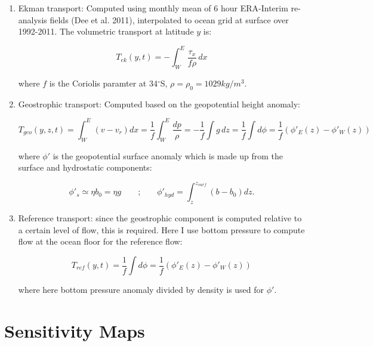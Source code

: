 \documentclass[a4paper,11pt]{article}
\newcommand{\degSym}{$^{\circ}$}
\begin{document}
    \begin{enumerate}
     \item Ekman transport: Computed using monthly mean of 6 hour ERA-Interim re-analysis fields (Dee et al. 2011), interpolated to ocean grid at surface over 1992-2011. The volumetric transport at latitude $y$ is: %
     
     \begin{equation}
      T_{ek}(y,t) = -\int_W^E\frac{\tau_x}{f\rho} \, dx
      \label{eq:ekTransp}
     \end{equation}
     
     where $f$ is the Coriolis paramter at 34\degSym S, $\rho = \rho_0 = 1029 kg/m^3$. 
     
     \item Geostrophic transport: Computed based on the geopotential height anomaly:
     
     \begin{equation}
      T_{geo}(y,z,t) = \int_W^E(v-v_r)dx = \dfrac{1}{f}\int_W^E \dfrac{dp}{\rho} = - \dfrac{1}{f} \int g\,dz = \dfrac{1}{f} \int d\phi= \dfrac{1}{f} (\phi'_E(z) - \phi'_W(z))
      \label{eq:geoTransp}
     \end{equation}
     
     where $\phi'$ is the geopotential surface anomaly which is made up from the surface and hydrostatic components:
     
     \begin{equation}
      \phi'_s \simeq \eta b_0 = \eta g \qquad\text{;}\qquad \phi'_{hyd} = \int_z^{z_{surf}} (b-b_0)dz .
      \label{eq:phiEqns}
     \end{equation}
    
    \item Reference transport: since the geostrophic component is computed relative to a certain level of flow, this is required. Here I use bottom pressure to compute flow at the ocean floor for the reference flow: 
    
    \begin{equation}
     T_{ref}(y,t) = \dfrac{1}{f} \int d\phi= \dfrac{1}{f} (\phi'_E(z) - \phi'_W(z))
     \label{eq:refTransp}
    \end{equation}

    where here bottom pressure anomaly divided by density is used for $\phi'$. 
 
    \end{enumerate}
    
    

 \section{Sensitivity Maps}
\end{document}
